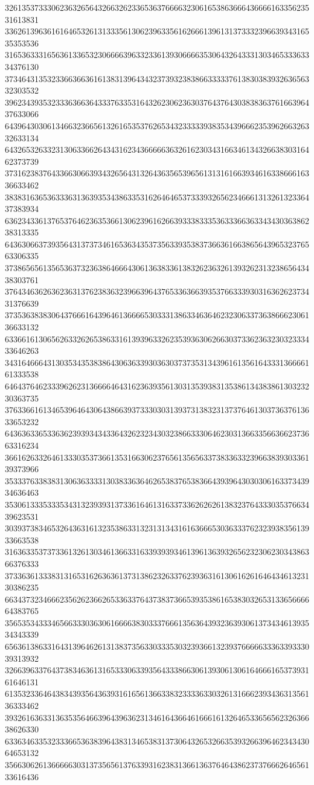 32613537333062363265643266326233653637666632306165386366643666616335623531613831
33626139636161646532613133356130623963356162666139613137333239663934316535353536
31653633316563613365323066663963323361393066663530643264333130346533363334376130
37346431353233663663616138313964343237393238386633333761383038393263656332303532
39623439353233363663643337633531643262306236303764376430383836376166396437633066
64396430306134663236656132616535376265343233333938353439666235396266326332633134
64326532633231306336626434316234366666363261623034316634613432663830316462373739
37316238376433663066393432656431326436356539656131316166393461633866616336633462
38383163653633363136393534386335316264646537333932656234666131326132336437383934
63623433613765376462363536613062396162663933383335363336636334343036386238313335
64363066373935643137373461653634353735633935383736636166386564396532376563306335
37386565613565363732363864666430613638336138326236326139326231323865643438303761
37643463626362363137623836323966396437653363663935376633393031636262373431376639
37353638383064376661643964613666653033313863346364623230633736386662306136633132
63366161306562633262653863316139396332623539363062663037336236323032333433646263
34316466643130353435383864306363393036303737353134396161356164333136666161333538
64643764623339626231366664643162363935613031353938313538613438386130323230363735
37633661613465396464306438663937333030313937313832313737646130373637613633653232
64363633653363623939343433643262323430323866333064623031366335663662373663316234
36616263326461333035373661353166306237656135656337383363323966383930336139373966
35333763383831306363333130383363646265383765383664393964303030616337343934636463
35306133353335343132393931373361646131633733626262613832376433303537663439623531
30393738346532643631613235386331323131343161636665303633376232393835613933663538
31636335373733613261303461366331633939393461396136393265623230623034386366376333
37336361333831316531626363613731386232633762393631613061626164643461323130386235
66343732346662356262366265336337643738373665393538616538303265313365666664383765
35653534333465663330363061666638303337666135636439323639306137343461393534343339
65636138633164313964626131383735633033353032393661323937666663336339333039313932
32663963376437383463613165333063393564333866306139306130616466616537393161646131
61353233646438343935643639316165613663383233336330326131666239343631356136333462
39326163633136353564663964396362313461643664616661613264653365656232636638626330
63363463353233366536383964383134653831373064326532663539326639646234343064653132
35663062613666663031373565613763393162383136613637646438623737666264656133616436
